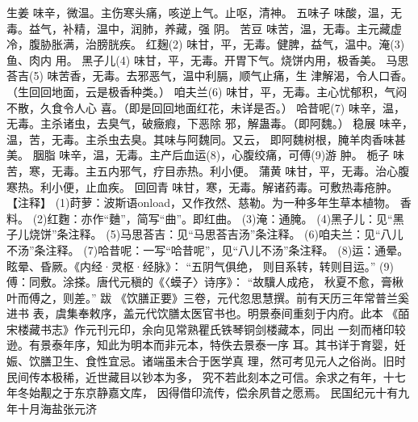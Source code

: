 \documentclass[12pt,UTF8]{ctexbook}
\begin{document}
生姜 味辛，微温。主伤寒头痛，咳逆上气。止呕，清神。
五味子 味酸，温，无毒。益气，补精，温中，润肺，养藏，强
阴。
苦豆 味苦，温，无毒。主元藏虚冷，腹胁胀满，治膀胱疾。
红麹(2) 味甘，平，无毒。健脾，益气，温中。淹(3)鱼、肉内
用。
黑子儿(4) 味甘，平，无毒。开胃下气。烧饼内用，极香美。
马思荅吉(5) 味苦香，无毒。去邪恶气，温中利膈，顺气止痛，生
津解渴，令人口香。（生回回地面，云是极香种类。）
咱夫兰(6) 味甘，平，无毒。主心忧郁积，气闷不散，久食令人心
喜。（即是回回地面红花，未详是否。）
哈昔呢(7) 味辛，温，无毒。主杀诸虫，去臭气，破癥瘕，下恶除
邪，解蛊毒。（即阿魏。）
稳展 味辛，温，苦，无毒。主杀虫去臭。其味与阿魏同。又云，
即阿魏树根，腌羊肉香味甚美。
胭脂 味辛，温，无毒。主产后血运(8)，心腹绞痛，可傅(9)游
肿。
栀子 味苦，寒，无毒。主五内邪气，疗目赤热。利小便。
蒲黄 味甘，平，无毒。治心腹寒热。利小便，止血疾。
回回青 味甘，寒，无毒。解诸药毒。可敷热毒疮肿。
【注释】
(1)莳萝：波斯语onload，又作孜然、慈勒。为一种多年生草本植物。
香料。
(2)红麴：亦作“麯”，简写“曲”。即红曲。
(3)淹：通腌。
(4)黑子儿：见“黑子儿烧饼”条注释。
(5)马思荅吉：见“马思荅吉汤”条注释。
(6)咱夫兰：见“八儿不汤”条注释。
(7)哈昔呢：一写“哈昔呢”，见“八儿不汤”条注释。
(8)运：通晕。眩晕、昏厥。《内经·灵枢·经脉》：
“五阴气俱绝，
则目系转，转则目运。”
(9)傅：同敷。涂搽。唐代元稹的《〈蟆子〉诗序》：
“故驥人成疮，
秋夏不愈，膏楸叶而傅之，则差。”
跋
《饮膳正要》三卷，元代忽思慧撰。前有天历三年常普兰奚进书
表，虞集奉敕序，盖元代饮膳太医官书也。明景泰间重刻于内府。此本
《皕宋楼藏书志》作元刊元印，余向见常熟瞿氏铁琴铜剑楼藏本，同出
一刻而楮印较逊。有景泰年序，知此为明本而非元本，特佚去景泰一序
耳。其书详于育婴，妊娠、饮膳卫生、食性宜忌。诸端虽未合于医学真
理，然可考见元人之俗尚。旧时民间传本极稀，近世藏目以钞本为多，
究不若此刻本之可信。余求之有年，十七年冬始觏之于东京静嘉文库，
因得借印流传，偿余夙昔之愿焉。
民国纪元十有九年十月海盐张元济

\backmatter
\end{document}
